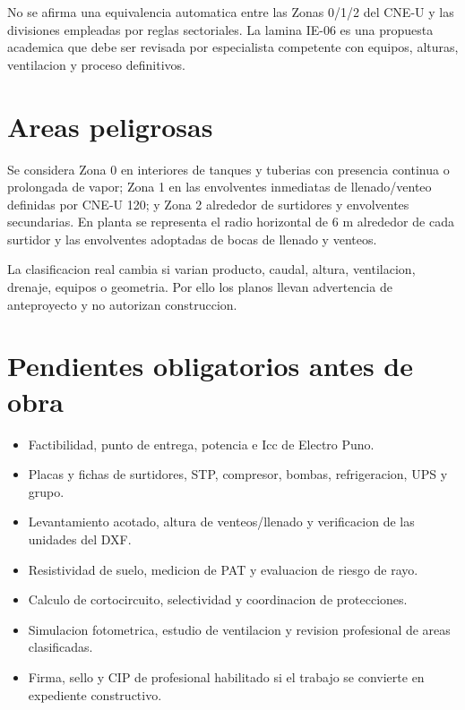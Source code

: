 No se afirma una equivalencia automatica entre las Zonas 0/1/2 del CNE-U y las divisiones empleadas por reglas sectoriales. La lamina IE-06 es una propuesta academica que debe ser revisada por especialista competente con equipos, alturas, ventilacion y proceso definitivos.

\section{Areas peligrosas}
Se considera Zona 0 en interiores de tanques y tuberias con presencia continua o prolongada de vapor; Zona 1 en las envolventes inmediatas de llenado/venteo definidas por CNE-U 120; y Zona 2 alrededor de surtidores y envolventes secundarias. En planta se representa el radio horizontal de 6 m alrededor de cada surtidor y las envolventes adoptadas de bocas de llenado y venteos.

La clasificacion real cambia si varian producto, caudal, altura, ventilacion, drenaje, equipos o geometria. Por ello los planos llevan advertencia de anteproyecto y no autorizan construccion.

\section{Pendientes obligatorios antes de obra}
\begin{itemize}
  \item Factibilidad, punto de entrega, potencia e Icc de Electro Puno.
  \item Placas y fichas de surtidores, STP, compresor, bombas, refrigeracion, UPS y grupo.
  \item Levantamiento acotado, altura de venteos/llenado y verificacion de las unidades del DXF.
  \item Resistividad de suelo, medicion de PAT y evaluacion de riesgo de rayo.
  \item Calculo de cortocircuito, selectividad y coordinacion de protecciones.
  \item Simulacion fotometrica, estudio de ventilacion y revision profesional de areas clasificadas.
  \item Firma, sello y CIP de profesional habilitado si el trabajo se convierte en expediente constructivo.
\end{itemize}
